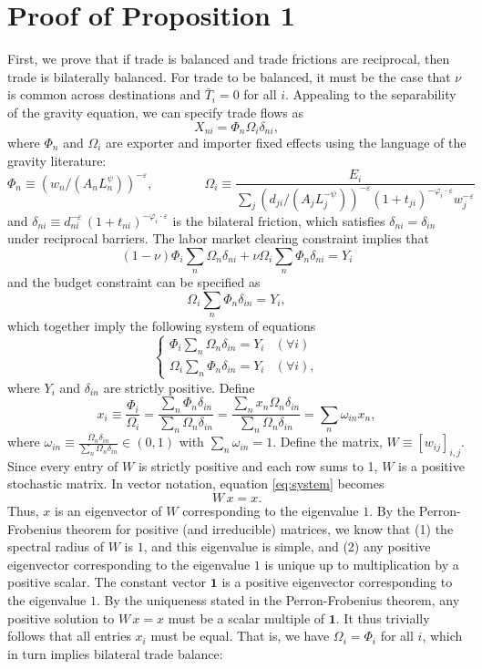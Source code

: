 \documentclass[12pt]{article}
\begin{document}
\section{Proof of Proposition 1}\label{proof1}
First, we prove that if trade is balanced and trade frictions are reciprocal, then trade is bilaterally balanced. For trade to be balanced, it must be the case that $\nu$ is common across destinations and $\bar{T}_{i}=0$ for all $i$. Appealing to the separability of the gravity equation, we can specify trade flows as
\[
X_{ni}=\Phi_{n}\Omega_{i}\delta_{ni},
\]
where $\Phi_n$ and $\Omega_i$ are exporter and importer fixed effects using the language of the gravity literature:
\[
\Phi_{n}\equiv\left(w_{n}/(A_{n}L_{n}^{\psi})\right)^{-\varepsilon},\qquad\qquad\Omega_{i}\equiv\frac{E_{i}}{\sum_{j}\left(d_{ji}/(A_{j}L_{j}^{-\psi})\right)^{-\varepsilon}(1+t_{ji})^{-\varphi_{i}\cdot\varepsilon}w_{j}^{-\varepsilon}}
\]
and $\delta_{ni}\equiv d_{ni}^{-\varepsilon}\,(1+t_{ni})^{-\varphi_{i}\cdot\varepsilon}$ is the bilateral friction, which satisfies $\delta_{ni}=\delta_{in}$ under reciprocal barriers. The labor market clearing constraint implies that
\[
\left(1-\nu\right)\Phi_{i}\sum_{n}\Omega_{n}\delta_{ni}+\nu\Omega_{i}\sum_{n}\Phi_{n}\delta_{ni}=Y_{i}
\]
and the budget constraint can be specified as
\[
\Omega_{i}\sum_{n}\Phi_{n}\delta_{in}=Y_{i},
\]
which together imply the following system of equations
\[
\begin{cases}
\Phi_{i}\sum_{n}\Omega_{n}\delta_{in}=Y_{i} & \left(\forall i\right)\\
\Omega_{i}\sum_{n}\Phi_{n}\delta_{in}=Y_{i} & \left(\forall i\right),
\end{cases}
\]
where $Y_{i}$ and $\delta_{in}$ are strictly positive. Define
\begin{equation} \label{eq:system}
    x_{i}\equiv\frac{\Phi_{i}}{\Omega_{i}}=\frac{\sum_{n}\Phi_{n}\delta_{in}}{\sum_{n}\Omega_{n}\delta_{in}}=\frac{\sum_{n}x_{n}\Omega_{n}\delta_{in}}{\sum_{n}\Omega_{n}\delta_{in}}=\sum_{n}\omega_{in}x_{n},
\end{equation} 
where $\omega_{in}\equiv\frac{\Omega_{n}\delta_{in}}{\sum_{n}\Omega_{n}\delta_{in}}\in(0,1)$ with $\sum_{n}\omega_{in}=1$. Define the matrix, $W \equiv [w_{ij}]_{i,j}$. Since every entry of \(W\) is strictly positive and each row sums to 1, \(W\) is a positive stochastic matrix. In vector notation, equation \eqref{eq:system} becomes
\[
W\,x = x.
\]
Thus, \(x\) is an eigenvector of \(W\) corresponding to the eigenvalue \(1\). By the Perron-Frobenius theorem for positive (and irreducible) matrices, we know that (1) the spectral radius of \(W\) is \(1\), and this eigenvalue is simple, and (2) any positive eigenvector corresponding to the eigenvalue \(1\) is unique up to multiplication by a positive scalar. The constant vector \(\mathbf{1}\) is a positive eigenvector corresponding to the eigenvalue \(1\). By the uniqueness stated in the Perron-Frobenius theorem, any positive solution to $W\,x = x$ must be a scalar multiple of \(\mathbf{1}\). It thus trivially follows that all entries \(x_i\) must be equal. That is, we have $\Omega_i=\Phi_i$ for all $i$, which in turn implies bilateral trade balance:
\end{document}
